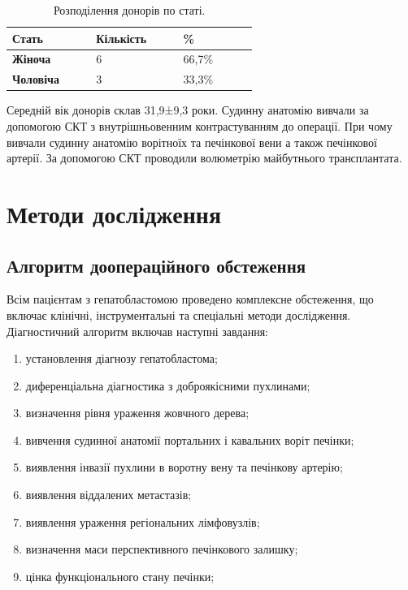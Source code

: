 \begin{table}[]
\centering
\caption{Розподілення донорів по статі.}
\label{tab:donorsex}
\begin{tabular}{|p{0.2\linewidth}|
                 p{0.2\linewidth}|
                 p{0.2\linewidth}|}
\hline
\textbf{Стать}    &  \textbf{Кількість} & \textbf{\%} \\ \hline
\textbf{Жіноча}   & 6                                         & 66,7\%                             \\ \hline
\textbf{Чоловіча} & 3                                         & 33,3\%                             \\ \hline
\end{tabular}
\end{table}

Середній вік донорів склав 31,9±9,3 роки. 
Судинну анатомію вивчали за допомогою СКТ з внутрішньовенним контрастуванням до операції. При чому вивчали судинну анатомію ворітноїх та печінкової вени а також печінкової артерії. 
За допомогою СКТ проводили волюметрію майбутнього трансплантата. 

\section{Методи дослідження}
\subsection{Алгоритм доопераційного обстеження}

Всім пацієнтам з гепатобластомою проведено комплексне обстеження, що включає клінічні, інструментальні та спеціальні методи дослідження.
Діагностичний алгоритм включав наступні завдання:
\begin{enumerate}
    \item установлення діагнозу гепатобластома;
    \item диференціальна діагностика з доброякісними пухлинами;
    \item визначення рівня ураження жовчного дерева;
    \item вивчення судинної анатомії портальних і кавальних воріт печінки;
    \item виявлення інвазії пухлини в воротну вену та печінкову артерію;
    \item виявлення віддалених метастазів;
    \item виявлення ураження регіональних лімфовузлів;
    \item визначення маси перспективного печінкового залишку;
    \item цінка функціонального стану печінки;
\end{enumerate}

